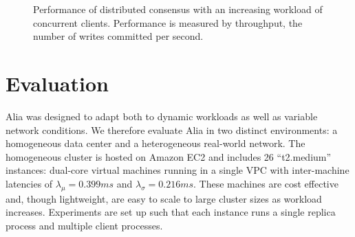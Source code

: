 \documentclass[letterpaper,10pt,twocolumn]{article}
\newcommand{\sys}{Alia\xspace}
\newcommand{\hmm}[1]{}%
\begin{document}
\hmm{We note that the safety violations Ongaro et al.~\cite{raft} use to
motivate joint consensus apply only when more than one node is added
at a time, and not at all when nodes are removed.

For the former, assume a system with $2m+1$ nodes. Assume a decision to
increase the size by two nodes is taken and acknowledged by a total of
$m+1$ nodes, followed by the failure of all of those acknowledgers.
The remaining $m$ nodes, together with the two new nodes, can constitute.
}

\begin{figure}[!t]
  \centering
  \caption{Performance of distributed consensus with an increasing workload of concurrent clients. Performance is measured by throughput, the number of writes committed per second.}
  \label{fig:scaling}
\end{figure}

\section{Evaluation}
\label{sec:evaluation}


\sys was designed to adapt both to dynamic workloads as well as
variable network conditions.
We therefore evaluate \sys in two distinct environments: a homogeneous data
center and a heterogeneous real-world network.
The homogeneous cluster is hosted on Amazon EC2 and includes 26
``t2.medium'' instances: dual-core virtual machines running in a single VPC
with inter-machine latencies of $\lambda_{\mu}=0.399ms$ and
$\lambda_{\sigma}=0.216ms$.
These machines are cost effective and, though lightweight, are easy to scale
to large cluster sizes as workload increases.
Experiments are set up such that each instance runs a single replica process
and multiple client processes.
\end{document}

